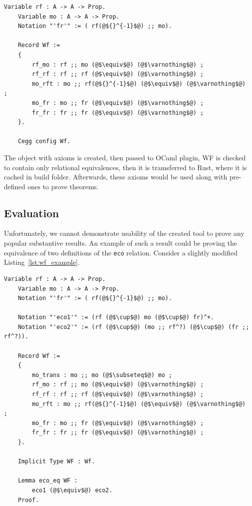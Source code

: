 \vspace{0.5cm}
\begin{lstlisting}[language=coq, label=lst:wf_example, caption={Well-formed example},captionpos=b]
    Variable rf : A -> A -> Prop.
    Variable mo : A -> A -> Prop.
    Notation "'fr'" := ( rf(@${}^{-1}$@) ;; mo).

    Record Wf :=
    { 
        rf_mo : rf ;; mo (@$\equiv$@) (@$\varnothing$@) ;
        rf_rf : rf ;; rf (@$\equiv$@) (@$\varnothing$@) ;
        mo_rft : mo ;; rf(@${}^{-1}$@) (@$\equiv$@) (@$\varnothing$@) ;
        mo_fr : mo ;; fr (@$\equiv$@) (@$\varnothing$@) ; 
        fr_fr : fr ;; fr (@$\equiv$@) (@$\varnothing$@) ;
    }.

    Cegg config Wf.
\end{lstlisting}

The object with axioms is created, then passed to OCaml plugin, WF is checked to contain only relational equivalences, then it is tramsferred to Rust, where it is cached in build folder. Afterwards, these axioms would be used along with pre-defined ones to prove theorems.

\subsection{Evaluation}
Unfortunately, we cannot demonstrate usability of the created tool to prove any popular substantive results. An example of such a result could be proving the equivalence of two definitions of the \texttt{eco} relation. Consider a slightly modified Listing~\ref{lst:wf_example}.

\vspace{0.5cm}
\begin{lstlisting}[language=coq, label=lst:eco_example, caption={Eco equivalent definitions}, captionpos=b]
    Variable rf : A -> A -> Prop.
    Variable mo : A -> A -> Prop.
    Notation "'fr'" := ( rf(@${}^{-1}$@) ;; mo).

    Notation "'eco1'" := (rf (@$\cup$@) mo (@$\cup$@) fr)^+.
    Notation "'eco2'" := (rf (@$\cup$@) (mo ;; rf^?) (@$\cup$@) (fr ;; rf^?)).

    Record Wf :=
    { 
        mo_trans : mo ;; mo (@$\subseteq$@) mo ; 
        rf_mo : rf ;; mo (@$\equiv$@) (@$\varnothing$@) ;
        rf_rf : rf ;; rf (@$\equiv$@) (@$\varnothing$@) ;
        mo_rft : mo ;; rf(@${}^{-1}$@) (@$\equiv$@) (@$\varnothing$@) ;
        mo_fr : mo ;; fr (@$\equiv$@) (@$\varnothing$@) ; 
        fr_fr : fr ;; fr (@$\equiv$@) (@$\varnothing$@) ;
    }.

    Implicit Type WF : Wf.

    Lemma eco_eq WF : 
        eco1 (@$\equiv$@) eco2.
    Proof.
\end{lstlisting}

